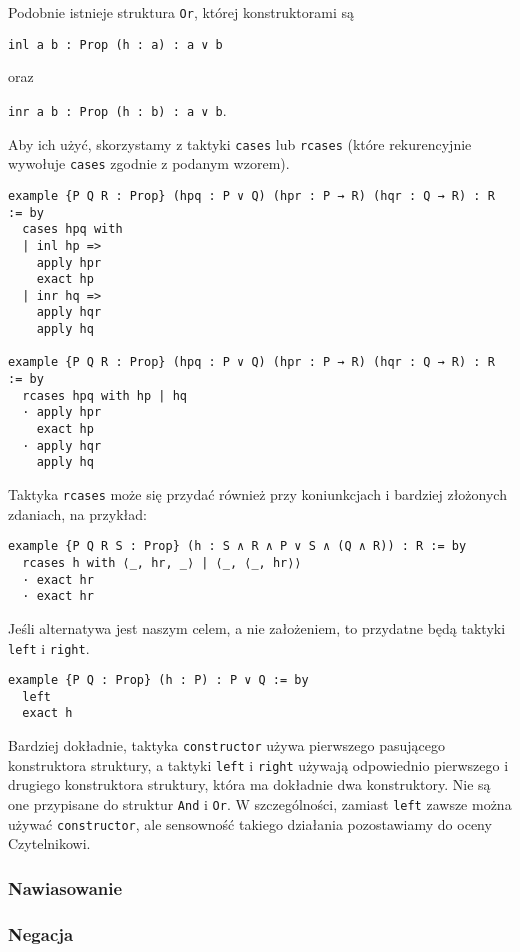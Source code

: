 \documentclass[polish,pretty]{angav}
\newcommand{\Lean}[1]{\texttt{#1}}
\newcommand{\centerLean}[2][]{\begin{center}\Lean{#2}#1\end{center}}
\begin{document}
Podobnie istnieje struktura \Lean{Or}, której konstruktorami są
\centerLean{inl {a b : Prop} (h : a) : a ∨ b}
oraz
\centerLean[.]{inr {a b : Prop} (h : b) : a ∨ b}
Aby ich użyć, skorzystamy z taktyki \Lean{cases} lub \Lean{rcases} (które rekurencyjnie wywołuje \Lean{cases} zgodnie z podanym wzorem).
\begin{verbatim}
example {P Q R : Prop} (hpq : P ∨ Q) (hpr : P → R) (hqr : Q → R) : R := by
  cases hpq with
  | inl hp =>
    apply hpr
    exact hp
  | inr hq =>
    apply hqr
    apply hq

example {P Q R : Prop} (hpq : P ∨ Q) (hpr : P → R) (hqr : Q → R) : R := by
  rcases hpq with hp | hq
  · apply hpr
    exact hp
  · apply hqr
    apply hq
\end{verbatim}

Taktyka \Lean{rcases} może się przydać również przy koniunkcjach i bardziej złożonych zdaniach, na przykład:
\begin{verbatim}
example {P Q R S : Prop} (h : S ∧ R ∧ P ∨ S ∧ (Q ∧ R)) : R := by
  rcases h with ⟨_, hr, _⟩ | ⟨_, ⟨_, hr⟩⟩
  · exact hr
  · exact hr
\end{verbatim}

Jeśli alternatywa jest naszym celem, a nie założeniem, to przydatne będą taktyki \Lean{left} i \Lean{right}.

\begin{verbatim}
example {P Q : Prop} (h : P) : P ∨ Q := by
  left
  exact h
\end{verbatim}

\begin{remark}
    Bardziej dokładnie, taktyka \Lean{constructor} używa pierwszego pasującego konstruktora struktury, a taktyki \Lean{left} i \Lean{right} używają odpowiednio pierwszego i drugiego konstruktora struktury, która ma dokładnie dwa konstruktory. Nie są one przypisane do struktur \Lean{And} i \Lean{Or}. W szczególności, zamiast \Lean{left} zawsze można używać \Lean{constructor}, ale sensowność takiego działania pozostawiamy do oceny Czytelnikowi.
\end{remark}

\subsubsection*{Nawiasowanie}

\subsubsection*{Negacja}
\end{document}
